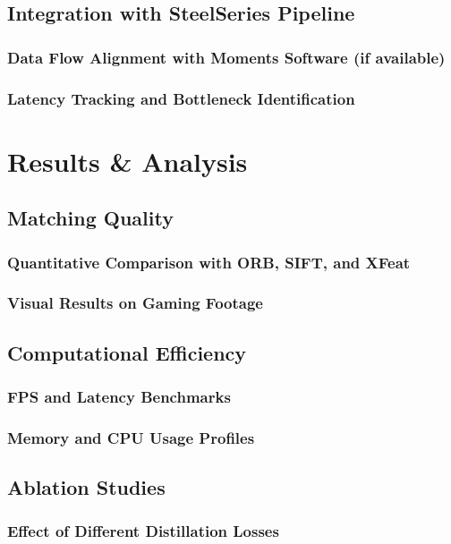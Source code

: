 \documentclass[a4paper,12pt]{report}
\begin{document}
\section{Integration with SteelSeries Pipeline}
\subsection{Data Flow Alignment with Moments Software (if available)}
\subsection{Latency Tracking and Bottleneck Identification}

\chapter{Results \& Analysis}
\section{Matching Quality}
\subsection{Quantitative Comparison with ORB, SIFT, and XFeat}
\subsection{Visual Results on Gaming Footage}

\section{Computational Efficiency}
\subsection{FPS and Latency Benchmarks}
\subsection{Memory and CPU Usage Profiles}

\section{Ablation Studies}
\subsection{Effect of Different Distillation Losses}
\end{document}
